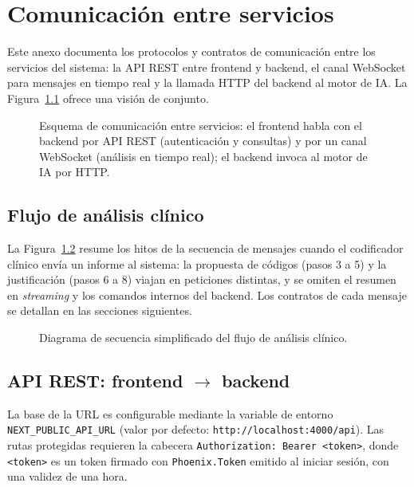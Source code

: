 \chapter{Comunicación entre servicios}
\label{cap:AnexoC}

Este anexo documenta los protocolos y contratos de comunicación entre los servicios del sistema: la API REST entre frontend y backend, el canal WebSocket para mensajes en tiempo real y la llamada HTTP del backend al motor de IA. La Figura~\ref{fig:conexion-fe-be} ofrece una visión de conjunto.

\begin{figure}[ht]
\centering
\resizebox{\textwidth}{!}{}
\caption{Esquema de comunicación entre servicios: el frontend habla con el backend por API REST (autenticación y consultas) y por un canal WebSocket (análisis en tiempo real); el backend invoca al motor de IA por HTTP.}
\label{fig:conexion-fe-be}
\end{figure}

\section{Flujo de análisis clínico}

La Figura~\ref{fig:seq-analisis} resume los hitos de la secuencia de mensajes cuando el codificador clínico envía un informe al sistema: la propuesta de códigos (pasos 3 a 5) y la justificación (pasos 6 a 8) viajan en peticiones distintas, y se omiten el resumen en \emph{streaming} y los comandos internos del backend. Los contratos de cada mensaje se detallan en las secciones siguientes.

\begin{figure}[ht]
\centering
\resizebox{\textwidth}{!}{}
\caption{Diagrama de secuencia simplificado del flujo de análisis clínico.}
\label{fig:seq-analisis}
\end{figure}

\section{API REST: frontend \texorpdfstring{$\rightarrow$}{->} backend}

La base de la URL es configurable mediante la variable de entorno \texttt{NEXT\_PUBLIC\_API\_URL} (valor por defecto: \texttt{http://localhost:\allowbreak{}4000/api}). Las rutas protegidas requieren la cabecera \texttt{Authorization: Bearer <token>}, donde \texttt{<token>} es un token firmado con \texttt{Phoenix.Token} emitido al iniciar sesión, con una validez de una hora.


